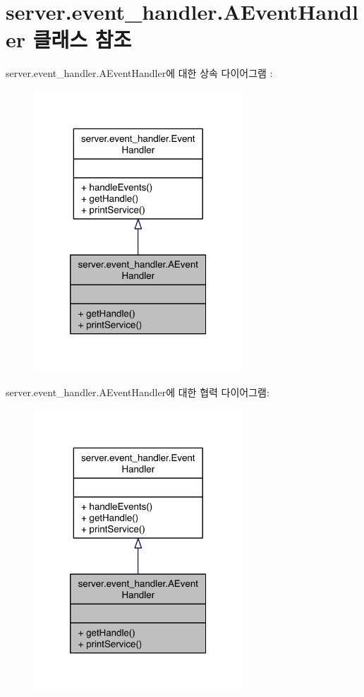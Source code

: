 \hypertarget{classserver_1_1event__handler_1_1_a_event_handler}{\section{server.\-event\-\_\-handler.\-A\-Event\-Handler 클래스 참조}
\label{classserver_1_1event__handler_1_1_a_event_handler}
}


server.\-event\-\_\-handler.\-A\-Event\-Handler에 대한 상속 다이어그램 \-: 
\nopagebreak
\begin{figure}[H]
\begin{center}
\leavevmode
\includegraphics[width=222pt]{classserver_1_1event__handler_1_1_a_event_handler__inherit__graph}
\end{center}
\end{figure}


server.\-event\-\_\-handler.\-A\-Event\-Handler에 대한 협력 다이어그램\-:
\nopagebreak
\begin{figure}[H]
\begin{center}
\leavevmode
\includegraphics[width=222pt]{classserver_1_1event__handler_1_1_a_event_handler__coll__graph}
\end{center}
\end{figure}
